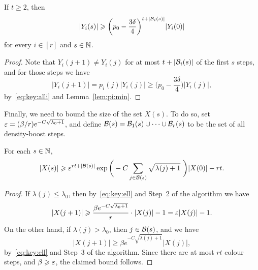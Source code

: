 \begin{lemma}
  \label{lem:Y:lower:bound} %
  If\/ $t \ge 2$, then
  $$|Y_i(s)| \geqslant \bigg( p_0 - \frac{3\delta}{4} \bigg)^{t + |\mathcal{B}_i(s)|} |Y_i(0)|$$
  for every $i \in [r]$ and $s \in \mathbb{N}$. 
\end{lemma}
%
\begin{proof}
  Note that $Y_i(j+1) \ne Y_i(j)$ for at most $t + |\mathcal{B}_i(s)|$ of the first $s$ steps, and for those steps we have
  $$|Y_i(j+1)| = p_i(j) |Y_i(j)| \ge \bigg( p_0 - \frac{3\delta}{4} \bigg) |Y_i(j)|,$$ 
  by~\eqref{eq:key:alli} and Lemma~\ref{lem:pi:min}.
\end{proof}

Finally, we need to bound the size of the set $X(s)$. To do so, set $\varepsilon = (\beta / r) e^{- C \sqrt{\lambda_0 + 1}}$, and define $\mathcal{B}(s) = \mathcal{B}_1(s) \cup \cdots \cup \mathcal{B}_r(s)$ to be the set of all density-boost steps. 


\begin{lemma}
  \label{lem:X:lower:bound} %
  For each $s \in \mathbb{N}$, 
  \begin{equation}\label{eq:X:lower:bound}
    |X(s)| \geqslant \varepsilon^{rt + |\mathcal{B}(s)|} \exp\bigg( - C \sum_{j \in \mathcal{B}(s)} \sqrt{\lambda(j)+1}\,\, \bigg) |X(0)| - rt.
  \end{equation}
\end{lemma}
%
\begin{proof}
  If $\lambda(j) \le \lambda_0$, then by~\eqref{eq:key:ell} and Step~2 of the algorithm we have
  $$|X(j+1)| \geqslant \frac{\beta e^{- C \sqrt{\lambda_0 + 1}}}{r} \cdot |X(j)| - 1 = \varepsilon |X(j)| - 1.$$ 
  On the other hand, if $\lambda(j) > \lambda_0$, then $j \in \mathcal{B}(s)$, and we have 
  $$|X(j+1)| \ge \beta e^{- C \sqrt{\lambda(j) + 1}} |X(j)|,$$ 
  by~\eqref{eq:key:ell} and Step~3 of the algorithm. Since there are at most $rt$ colour steps, and $\beta \geqslant \varepsilon$, the claimed bound follows.
\end{proof}

